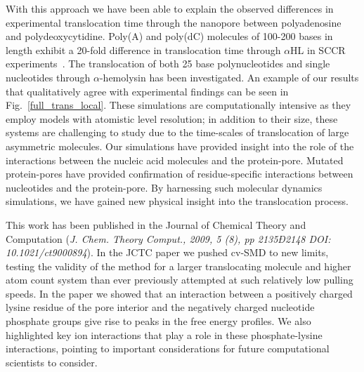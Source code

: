 \documentclass[a4paper,10pt]{article}
\newcommand{\ahl}{$\alpha$HL }
\begin{document}
With this approach we have been able to explain the observed differences in experimental translocation time through the nanopore between polyadenosine and polydeoxycytidine. Poly(A) and poly(dC) molecules of 100-200 bases in length exhibit a 20-fold difference in translocation time through \ahl in SCCR experiments~\cite{akeson}. The translocation of both 25 base polynucleotides and single nucleotides through $\alpha$-hemolysin has been investigated. An example of our results that qualitatively agree with experimental findings can be seen in Fig.~\ref{full_trans_local}. These simulations are computationally intensive as they employ models with atomistic level resolution; in addition to their size, these systems are challenging to study due to the time-scales of translocation of large asymmetric molecules. Our simulations have provided insight into the role of the interactions between the nucleic acid molecules and the protein-pore. Mutated protein-pores have provided confirmation of residue-specific interactions between nucleotides and the protein-pore. By harnessing such molecular dynamics simulations, we have gained new physical insight into the translocation process.

This work has been published in the Journal of Chemical Theory and Computation ({\it J. Chem. Theory Comput., 2009, 5  (8), pp 2135Ð2148
DOI: 10.1021/ct9000894}). In the JCTC paper we pushed cv-SMD to new limits, testing the validity of the method for a larger translocating molecule and higher atom count system than ever previously attempted at such relatively low pulling speeds. In the paper we showed that an interaction between a positively charged lysine residue of the pore interior and the negatively charged nucleotide phosphate groups give rise to peaks in the free energy profiles. We also highlighted key ion interactions that play a role in these phosphate-lysine interactions, pointing to important considerations for future computational scientists to consider.
\end{document}
